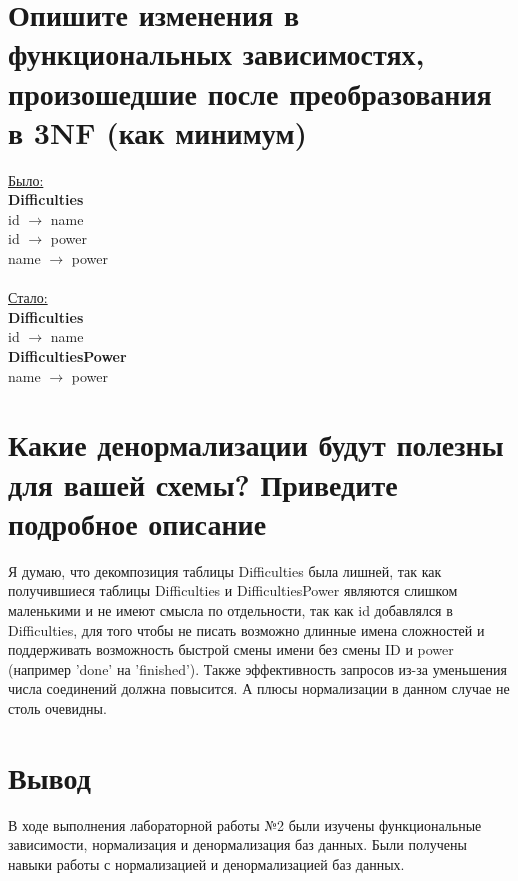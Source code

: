 \documentclass[12pt,onecolumn]{article}
\begin{document}
\section{Опишите изменения в функциональных зависимостях, произошедшие
после преобразования в 3NF (как минимум)}
\begin{multicols}{2}

  \noindent\underline{Было:}\\
  \textbf{Difficulties}\\
  id $\to$ name\\
  id $\to$ power\\
  name $\to$ power\\
  \mbox{}\\
  \underline{Стало:}\\
  \textbf{Difficulties}\\
  id $\to$ name\\
  \textbf{DifficultiesPower}\\
  name $\to$ power\\
\end{multicols}
\section{Какие денормализации будут полезны для вашей схемы? Приведите
подробное описание}

Я думаю, что декомпозиция таблицы Difficulties была лишней, так как получившиеся таблицы Difficulties и
DifficultiesPower являются слишком маленькими и не имеют смысла по отдельности, так как id добавлялся в Difficulties, для того чтобы не писать возможно длинные имена сложностей и поддерживать возможность быстрой смены имени без смены ID и power (например 'done' на 'finished'). Также эффективность запросов из-за уменьшения числа соединений должна повысится. А плюсы нормализации в данном случае не столь очевидны.\\

\section{Вывод}
В ходе выполнения лабораторной работы №2 были изучены функциональные зависимости, нормализация и денормализация баз данных. Были получены навыки работы с нормализацией и денормализацией баз данных.
\end{document}
